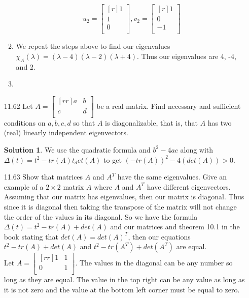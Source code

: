 \documentclass[12pt]{article}
\theoremstyle{definition}
\newtheorem*{solution}{Solution} %
\theoremstyle{plain}
\begin{document}
\begin{enumerate}
\begin{enumerate}
	\[ u_{2} = \begin{bmatrix}[r]1\\1\\0\\\end{bmatrix}, v_2=\begin{bmatrix}[r]1\\0\\-1\\\end{bmatrix} \]
	\item We repeat the steps above to find our eigenvalues $\chi_A(\lambda)=(\lambda-4)(\lambda-2)(\lambda+4)$. Thus our eigenvalues are 4, -4, and 2.
	\item 
	\end{enumerate}
\item[11.62]Let $A=\begin{bmatrix}[rr]a&b\\c&d\\\end{bmatrix}$ be a real matrix. Find necessary and sufficient conditions on $a,b,c,d$ so that $A$ is diagonalizable, that is, that $A$ has two (real) linearly independent eigenvectors.\\
	\begin{solution}
	We use the quadratic formula and $b^2-4ac$ along with $\Delta (t)=t^2-tr(A)t_det(A)$ to get $(-tr(A))^2-4(det(A)) > 0$.
	\end{solution}
\item[11.63]Show that matrices $A$ and $A^T$ have the same eigenvalues. Give an example of a $2 \times 2$ matrix $A$ where $A$ and $A^T$ have different eigenvectors.\\
	Assuming that our matrix has eigenvalues, then our matrix is diagonal. Thus since it is diagonal then taking the transpose of the matrix will not change the order of the values in its diagonal. So we have the formula $\Delta(t)=t^2-tr(A)+det(A)$ and our matrices and theorem 10.1 in the book stating that $det(A)=det(A)^T$, then our equations $t^2-tr(A)+det(A)$ and $t^2-tr(A^T)+det(A^T)$ are equal.\\
	Let $A=\begin{bmatrix}[rr]1&1\\0&1\\\end{bmatrix}$. The values in the diagonal can be any number so long as they are equal. The value in the top right can be any value as long as it is not zero and the value at the bottom left corner must be equal to zero.

\end{enumerate}
\end{document}

